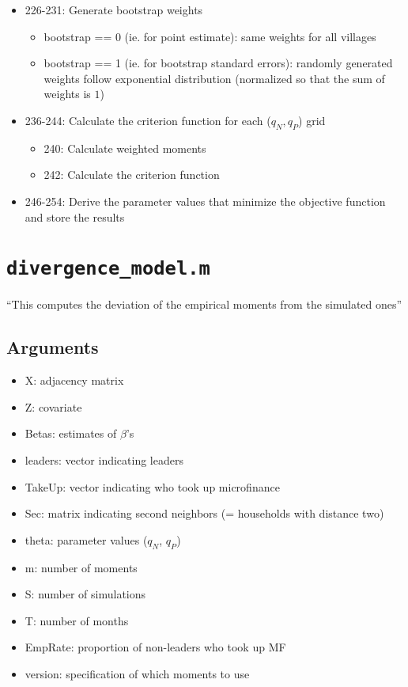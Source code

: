 \documentclass[10pt,letterpaper]{article}
\begin{document}
\begin{itemize}
    \begin{itemize}
      \item 226-231: Generate bootstrap weights 
        \begin{itemize}
          \item bootstrap == 0 (ie. for point estimate): same weights for all villages
          \item bootstrap == 1 (ie. for bootstrap standard errors): randomly generated weights follow exponential distribution (normalized so that the sum of weights is $1$)
        \end{itemize}
      \item 236-244: Calculate the criterion function for each ($q_N, q_P$) grid
        \begin{itemize}
          \item 240: Calculate weighted moments 
          \item 242: Calculate the criterion function
        \end{itemize}
      \item 246-254: Derive the parameter values that minimize the objective function and store the results
    \end{itemize}
\end{itemize}


\section{\texttt{divergence\_model.m}}\label{divergence_model}

``This computes the deviation of the empirical moments from the simulated ones''

\subsection*{Arguments}
\begin{itemize}
  \item X: adjacency matrix
  \item Z: covariate
  \item Betas: estimates of $\beta$'s 
  \item leaders: vector indicating leaders
  \item TakeUp: vector indicating who took up microfinance
  \item Sec: matrix indicating second neighbors (= households with distance two)
  \item theta: parameter values ($q_N$, $q_P$)
  \item m: number of moments
  \item S: number of simulations
  \item T: number of months
  \item EmpRate: proportion of non-leaders who took up MF
  \item version: specification of which moments to use
\end{itemize}
\end{document}
